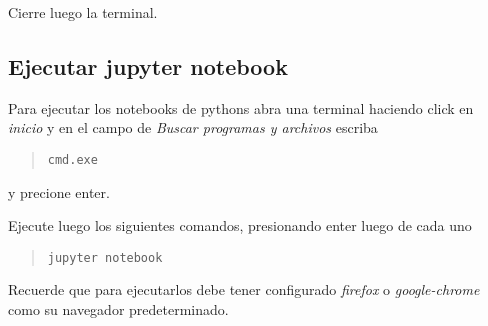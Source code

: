 \documentclass[hidelinks,12pt]{article}
\begin{document}
Cierre luego la terminal.

\subsection{Ejecutar jupyter notebook}
Para ejecutar los notebooks de pythons abra una terminal haciendo click en 
\emph{inicio} y en el campo de \emph{Buscar programas y archivos} escriba 
\begin{quote}
\begin{verbatim}
cmd.exe
\end{verbatim}
\end{quote}
y precione enter.

Ejecute luego los siguientes comandos, presionando enter luego de cada uno

\begin{quote}
\begin{verbatim}
jupyter notebook
\end{verbatim}
\end{quote}

Recuerde que para ejecutarlos debe tener configurado \emph{firefox} o
\emph{google-chrome} como su navegador predeterminado.

\end{document}
